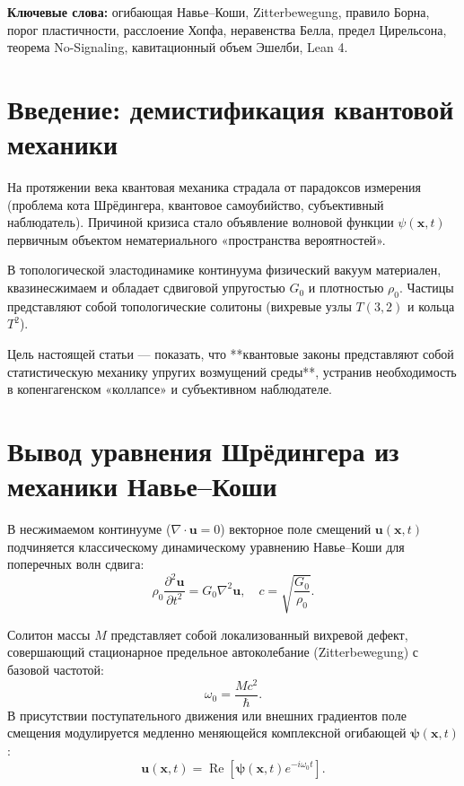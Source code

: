 \documentclass[11pt,a4paper]{article}
\theoremstyle{definition}
\theoremstyle{remark}
\begin{document}
\vspace{2mm}
\noindent\textbf{Ключевые слова:} огибающая Навье--Коши, Zitterbewegung, правило Борна, порог пластичности, расслоение Хопфа, неравенства Белла, предел Цирельсона, теорема No-Signaling, кавитационный объем Эшелби, Lean 4.

\section{Введение: демистификация квантовой механики}
На протяжении века квантовая механика страдала от парадоксов измерения (проблема кота Шрёдингера, квантовое самоубийство, субъективный наблюдатель). Причиной кризиса стало объявление волновой функции $\psi(\mathbf{x}, t)$ первичным объектом нематериального «пространства вероятностей».

В топологической эластодинамике континуума физический вакуум материален, квазинесжимаем и обладает сдвиговой упругостью $G_0$ и плотностью $\rho_0$. Частицы представляют собой топологические солитоны (вихревые узлы $T(3,2)$ и кольца $T^2$). 

Цель настоящей статьи — показать, что **квантовые законы представляют собой статистическую механику упругих возмущений среды**, устранив необходимость в копенгагенском «коллапсе» и субъективном наблюдателе.

\section{Вывод уравнения Шрёдингера из механики Навье--Коши}
В несжимаемом континууме ($\nabla \cdot \mathbf{u} = 0$) векторное поле смещений $\mathbf{u}(\mathbf{x}, t)$ подчиняется классическому динамическому уравнению Навье--Коши для поперечных волн сдвига:
\begin{equation}
    \rho_0 \frac{\partial^2 \mathbf{u}}{\partial t^2} = G_0 \nabla^2 \mathbf{u}, \quad c = \sqrt{\frac{G_0}{\rho_0}}.
    \label{eq:navier_cauchy}
\end{equation}

Солитон массы $M$ представляет собой локализованный вихревой дефект, совершающий стационарное предельное автоколебание (Zitterbewegung) с базовой частотой:
\begin{equation}
    \omega_0 = \frac{M c^2}{\hbar}.
\end{equation}
В присутствии поступательного движения или внешних градиентов поле смещения модулируется медленно меняющейся комплексной огибающей $\boldsymbol{\psi}(\mathbf{x}, t)$:
\begin{equation}
    \mathbf{u}(\mathbf{x}, t) = \operatorname{Re}\left[ \boldsymbol{\psi}(\mathbf{x}, t) e^{-i \omega_0 t} \right].
\end{equation}
\end{document}
